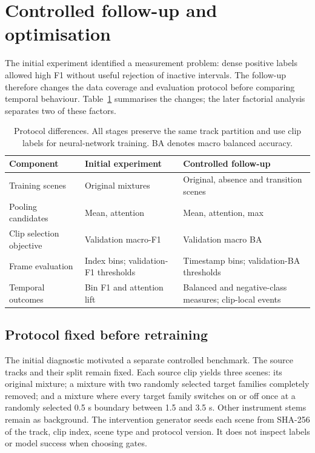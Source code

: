 \documentclass[10pt,a4paper]{article}
\begin{document}
\section{Controlled follow-up and optimisation}
\label{sec:controlled}
The initial experiment identified a measurement problem: dense positive labels allowed high F1 without useful rejection of inactive intervals. The follow-up therefore changes the data coverage and evaluation protocol before comparing temporal behaviour. Table~\ref{tab:protocols} summarises the changes; the later factorial analysis separates two of these factors.

\begin{table}[H]
\centering\small
\caption{Protocol differences. All stages preserve the same track partition and use clip labels for neural-network training. BA denotes macro balanced accuracy.}
\label{tab:protocols}
\begin{tabular}{p{.23\linewidth}p{.31\linewidth}p{.34\linewidth}}\toprule
Component & Initial experiment & Controlled follow-up\\\midrule
Training scenes & Original mixtures & Original, absence and transition scenes\\
Pooling candidates & Mean, attention & Mean, attention, max\\
Clip selection objective & Validation macro-F1 & Validation macro BA\\
Frame evaluation & Index bins; validation-F1 thresholds & Timestamp bins; validation-BA thresholds\\
Temporal outcomes & Bin F1 and attention lift & Balanced and negative-class measures; clip-local events\\\bottomrule
\end{tabular}
\end{table}

\subsection{Protocol fixed before retraining}
The initial diagnostic motivated a separate controlled benchmark. The source tracks and their split remain fixed. Each source clip yields three scenes: its original mixture; a mixture with two randomly selected target families completely removed; and a mixture where every target family switches on or off once at a randomly selected 0.5 s boundary between 1.5 and 3.5 s. Other instrument stems remain as background. The intervention generator seeds each scene from SHA-256 of the track, clip index, scene type and protocol version. It does not inspect labels or model success when choosing gates.
\end{document}
